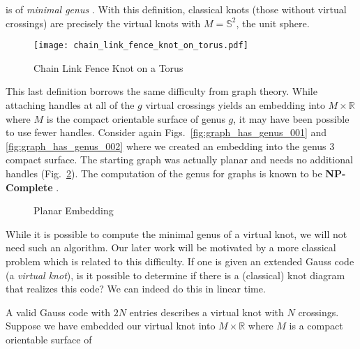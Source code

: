         is of \textit{minimal genus} \cite{KuperbergVirtualLink}.
        With this definition, classical knots (those without virtual crossings)
        are precisely the virtual knots with $M=\mathbb{S}^{2}$,
        the unit sphere.
        \begin{figure}
            \centering
            \texttt{[image: chain\_link\_fence\_knot\_on\_torus.pdf]}
            \caption{Chain Link Fence Knot on a Torus}
            \label{fig:chain_link_fence_knot_on_torus}
        \end{figure}
        \par\hfill\par
        This last definition borrows the same difficulty from graph theory.
        While attaching handles at all of the $g$ virtual crossings yields an
        embedding into $M\times\mathbb{R}$ where $M$ is the compact orientable
        surface of genus $g$, it may have been possible to use fewer handles.
        Consider again Figs.~\ref{fig:graph_has_genus_001} and
        \ref{fig:graph_has_genus_002} where we created an embedding into the
        genus 3 compact surface. The starting graph was actually planar and
        needs no additional handles (Fig.~\ref{fig:graph_has_genus_003}).
        The computation of the genus for graphs is known to be
        \textbf{NP-Complete} \cite{GareyJohnsonGraphCrossingNumberNPComplete}.
        \begin{figure}
            \centering
            \caption{Planar Embedding}
            \label{fig:graph_has_genus_003}
        \end{figure}
        \par\hfill\par
        While it is possible to compute the minimal genus of a virtual knot,
        we will not need such an algorithm. Our later work will be motivated
        by a more classical problem which is related to this difficulty.
        If one is given an extended Gauss code (a \textit{virtual knot}),
        is it possible to determine if there is a (classical) knot diagram
        that realizes this code? We can indeed do this in linear time.
        \par\hfill\par
        A valid Gauss code with $2N$ entries describes a virtual knot with
        $N$ crossings. Suppose we have embedded our virtual knot into
        $M\times\mathbb{R}$ where $M$ is a compact orientable surface of
